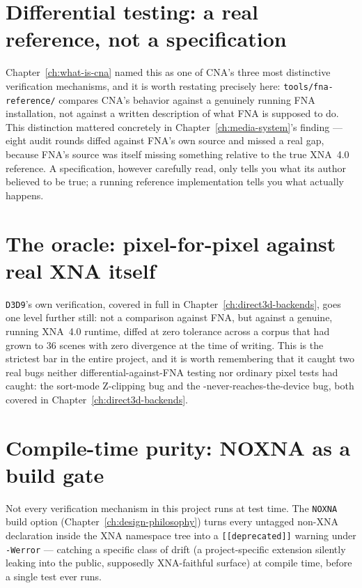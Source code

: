 \section{Differential testing: a real reference, not a specification}

Chapter~\ref{ch:what-is-cna} named this as one of CNA's three most distinctive verification
mechanisms, and it is worth restating precisely here: \texttt{tools/fna-reference/} compares
CNA's behavior against a genuinely running FNA installation, not against a written
description of what FNA is supposed to do. This distinction mattered concretely in
Chapter~\ref{ch:media-system}'s  finding --- eight audit rounds diffed against
FNA's own source and missed a real gap, because FNA's source was itself missing something
relative to the true XNA~4.0 reference. A specification, however carefully read, only tells
you what its author believed to be true; a running reference implementation tells you what
actually happens.

\section{The oracle: pixel-for-pixel against real XNA itself}

\texttt{D3D9}'s own verification, covered in full in Chapter~\ref{ch:direct3d-backends}, goes
one level further still: not a comparison against FNA, but against a genuine, running XNA~4.0
runtime, diffed at zero tolerance across a corpus that had grown to 36 scenes with zero
divergence at the time of writing. This is the strictest bar in the entire project, and it is
worth remembering that it caught two real bugs neither differential-against-FNA testing nor
ordinary pixel tests had caught: the sort-mode Z-clipping bug and the
-never-reaches-the-device bug, both covered in
Chapter~\ref{ch:direct3d-backends}.

\section{Compile-time purity: NOXNA as a build gate}

Not every verification mechanism in this project runs at test time. The \texttt{NOXNA} build
option (Chapter~\ref{ch:design-philosophy}) turns every untagged non-XNA declaration inside
the XNA namespace tree into a \texttt{[[deprecated]]} warning under \texttt{-Werror} ---
catching a specific class of drift (a project-specific extension silently leaking into the
public, supposedly XNA-faithful surface) at compile time, before a single test ever runs.


